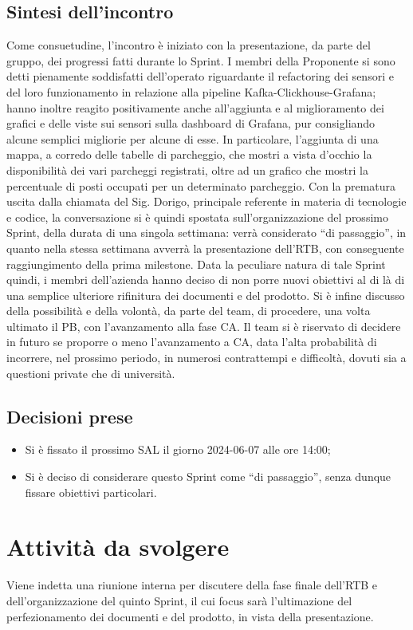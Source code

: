 \documentclass[8pt]{article}
\newcommand{\signatureline}[1]{%
	 \par\vspace{0.5cm}
	\noindent\makebox[\linewidth][r]{\rule{0.2\textwidth}{0.5pt}\hspace{3cm}\makebox[0pt][r]{\vspace{3pt}\footnotesize #1}}%
}
\begin{document}
\subsection{Sintesi dell'incontro}
Come consuetudine, l'incontro è iniziato con la presentazione, da parte del gruppo, dei progressi fatti durante lo Sprint. I membri della
Proponente si sono detti pienamente soddisfatti dell'operato riguardante il refactoring dei sensori e del loro funzionamento in relazione
alla pipeline Kafka-Clickhouse-Grafana; hanno inoltre reagito positivamente anche all'aggiunta e al miglioramento dei grafici e delle viste
sui sensori sulla dashboard di Grafana, pur consigliando alcune semplici migliorie per alcune di esse. In particolare, l'aggiunta di una
mappa, a corredo delle tabelle di parcheggio, che mostri a vista d'occhio la disponibilità dei vari parcheggi registrati, oltre ad un
grafico che mostri la percentuale di posti occupati per un determinato parcheggio. Con la prematura uscita dalla chiamata del Sig. Dorigo,
principale referente in materia di tecnologie e codice, la conversazione si è quindi spostata sull'organizzazione del prossimo Sprint, della
durata di una singola settimana: verrà considerato ``di passaggio'', in quanto nella stessa settimana avverrà la presentazione dell'RTB, con conseguente
raggiungimento della prima milestone. Data la peculiare natura di tale Sprint quindi, i membri dell'azienda hanno deciso di non porre nuovi obiettivi
al di là di una semplice ulteriore rifinitura dei documenti e del prodotto. Si è infine discusso della possibilità e della volontà, da parte del 
team, di procedere, una volta ultimato il PB, con l'avanzamento alla fase CA. Il team si è riservato di decidere in futuro se proporre o meno 
l'avanzamento a CA, data l'alta probabilità di incorrere, nel prossimo periodo, in numerosi contrattempi e difficoltà, dovuti sia a questioni 
private che di università. 

\subsection{Decisioni prese}
\begin{itemize}
	\setlength\itemsep{0em}
	\item Si è fissato il prossimo SAL il giorno 2024-06-07 alle ore 14:00;
	\item Si è deciso di considerare questo Sprint come ``di passaggio'', senza dunque fissare obiettivi particolari.
\end{itemize}
\newpage
\section{Attività da svolgere}
Viene indetta una riunione interna per discutere della fase finale dell'RTB e dell'organizzazione del quinto Sprint, il cui focus
sarà l'ultimazione del perfezionamento dei documenti e del prodotto, in vista della presentazione. 
\signatureline{Padova, 2024-06-04}
\end{document}
